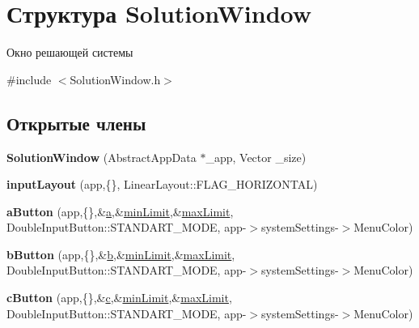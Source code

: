 \hypertarget{struct_solution_window}{
\section{Структура SolutionWindow}
\label{struct_solution_window}
}


Окно решающей системы  




{\ttfamily \#include $<$SolutionWindow.h$>$}

\subsection*{Открытые члены}
\begin{DoxyCompactItemize}
\item 
\hypertarget{struct_solution_window_a2547013608af5cba7d78d21b6b6d7c48}{
{\bfseries SolutionWindow} (AbstractAppData $\ast$\_\-app, Vector \_\-size)}
\label{struct_solution_window_a2547013608af5cba7d78d21b6b6d7c48}

\item 
\hypertarget{struct_solution_window_a305d44e316a355b7d8c69546da58f824}{
{\bfseries inputLayout} (app,\{\}, LinearLayout::FLAG\_\-HORIZONTAL)}
\label{struct_solution_window_a305d44e316a355b7d8c69546da58f824}

\item 
\hypertarget{struct_solution_window_a175022b70954fae40ba27f4ea68125d9}{
{\bfseries aButton} (app,\{\},\&\hyperlink{group___u_i_ga4a34577d3eee1be3aa79ae62b4292ee3}{a},\&\hyperlink{group___u_i_ga0790e352f0b21712488f063fe52dbbed}{minLimit},\&\hyperlink{group___u_i_ga682969b1ad756864beaacb4fa1b8120d}{maxLimit}, DoubleInputButton::STANDART\_\-MODE, app-\/$>$systemSettings-\/$>$MenuColor)}
\label{struct_solution_window_a175022b70954fae40ba27f4ea68125d9}

\item 
\hypertarget{struct_solution_window_a6a087dee81c3c01d925d7527710709f5}{
{\bfseries bButton} (app,\{\},\&\hyperlink{group___u_i_ga4309ca79bdd7b0fedaedecb6e6e31f04}{b},\&\hyperlink{group___u_i_ga0790e352f0b21712488f063fe52dbbed}{minLimit},\&\hyperlink{group___u_i_ga682969b1ad756864beaacb4fa1b8120d}{maxLimit}, DoubleInputButton::STANDART\_\-MODE, app-\/$>$systemSettings-\/$>$MenuColor)}
\label{struct_solution_window_a6a087dee81c3c01d925d7527710709f5}

\item 
\hypertarget{struct_solution_window_a76137e29f12768665f0beb001cab8539}{
{\bfseries cButton} (app,\{\},\&\hyperlink{group___u_i_ga30d6d773e312cb1fefce1d66ec691ffa}{c},\&\hyperlink{group___u_i_ga0790e352f0b21712488f063fe52dbbed}{minLimit},\&\hyperlink{group___u_i_ga682969b1ad756864beaacb4fa1b8120d}{maxLimit}, DoubleInputButton::STANDART\_\-MODE, app-\/$>$systemSettings-\/$>$MenuColor)}
\label{struct_solution_window_a76137e29f12768665f0beb001cab8539}


\end{DoxyCompactItemize}
